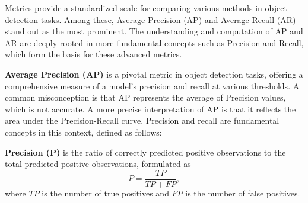 \documentclass[report.tex]{subfiles}
\begin{document}


    Metrics provide a standardized scale for comparing various methods in object detection tasks. Among these, Average Precision (AP) and Average Recall (AR) stand out as the most prominent. The understanding and computation of AP and AR are deeply rooted in more fundamental concepts such as Precision and Recall, which form the basis for these advanced metrics.
    
    \textbf{Average Precision (AP)} is a pivotal metric in object detection tasks, offering a comprehensive measure of a model's precision and recall at various thresholds. A common misconception is that AP represents the average of Precision values, which is not accurate. A more precise interpretation of AP is that it reflects the area under the Precision-Recall curve. Precision and recall are fundamental concepts in this context, defined as follows:

    \textbf{Precision (P)} is the ratio of correctly predicted positive observations to the total predicted positive observations, formulated as 
    \[
    P = \frac{TP}{TP + FP},
    \]
    where \( TP \) is the number of true positives and \( FP \) is the number of false positives.
\end{document}
